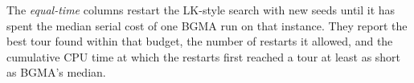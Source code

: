 The \emph{equal-time} columns restart the LK-style search with new seeds until it has spent the median
serial cost of one BGMA  run on that instance. They report the best tour found within that
budget, the number of restarts it allowed, and the cumulative CPU time at which the restarts first
reached a tour at least as short as BGMA's median.
